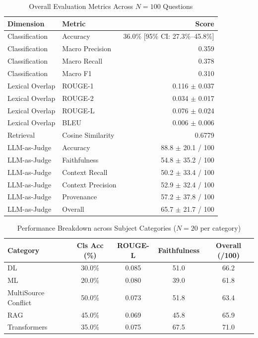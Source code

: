 \begin{table}[htbp]
\centering
\caption{Overall Evaluation Metrics Across $N=100$ Questions}
\label{tab:overall_results}
\begin{tabular}{llr}
\toprule
\textbf{Dimension} & \textbf{Metric} & \textbf{Score} \\
\midrule
Classification & Accuracy & 36.0\% [95\% CI: 27.3\%--45.8\%] \\
Classification & Macro Precision & 0.359 \\
Classification & Macro Recall & 0.378 \\
Classification & Macro F1 & 0.310 \\
\midrule
Lexical Overlap & ROUGE-1 & 0.116 $\pm$ 0.037 \\
Lexical Overlap & ROUGE-2 & 0.034 $\pm$ 0.017 \\
Lexical Overlap & ROUGE-L & 0.076 $\pm$ 0.024 \\
Lexical Overlap & BLEU & 0.006 $\pm$ 0.006 \\
\midrule
Retrieval & Cosine Similarity & 0.6779 \\
\midrule
LLM-as-Judge & Accuracy & 88.8 $\pm$ 20.1 / 100 \\
LLM-as-Judge & Faithfulness & 54.8 $\pm$ 35.2 / 100 \\
LLM-as-Judge & Context Recall & 50.2 $\pm$ 33.4 / 100 \\
LLM-as-Judge & Context Precision & 52.9 $\pm$ 32.4 / 100 \\
LLM-as-Judge & Provenance & 57.2 $\pm$ 37.8 / 100 \\
LLM-as-Judge & Overall & 65.7 $\pm$ 21.7 / 100 \\
\bottomrule
\end{tabular}
\end{table}

\begin{table}[htbp]
\centering
\caption{Performance Breakdown across Subject Categories ($N=20$ per category)}
\label{tab:category_breakdown}
\begin{tabular}{lcccc}
\toprule
\textbf{Category} & \textbf{Cls Acc (\%)} & \textbf{ROUGE-L} & \textbf{Faithfulness} & \textbf{Overall (/100)} \\
\midrule
DL & 30.0\% & 0.085 & 51.0 & 66.2 \\
ML & 20.0\% & 0.080 & 39.0 & 61.8 \\
MultiSource Conflict & 50.0\% & 0.073 & 51.8 & 63.4 \\
RAG & 45.0\% & 0.069 & 45.8 & 65.9 \\
Transformers & 35.0\% & 0.075 & 67.5 & 71.0 \\
\bottomrule
\end{tabular}
\end{table}

